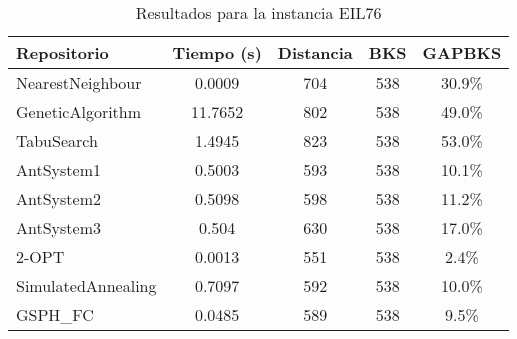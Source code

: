 \begin{table}[H]
\centering
\caption{Resultados para la instancia EIL76}
\begin{tabular}{|l|c|c|c|c|}
\hline
\textbf{Repositorio} & \textbf{Tiempo (s)} & \textbf{Distancia} & \textbf{BKS} & \textbf{GAPBKS} \\ 
\hline
NearestNeighbour & 0.0009 & 704 & 538 & 30.9\% \\ 
GeneticAlgorithm & 11.7652 & 802 & 538 & 49.0\% \\ 
TabuSearch & 1.4945 & 823 & 538 & 53.0\% \\ 
AntSystem1 & 0.5003 & 593 & 538 & 10.1\% \\ 
AntSystem2 & 0.5098 & 598 & 538 & 11.2\% \\ 
AntSystem3 & 0.504 & 630 & 538 & 17.0\% \\ 
2-OPT & 0.0013 & 551 & 538 & 2.4\% \\ 
SimulatedAnnealing & 0.7097 & 592 & 538 & 10.0\% \\ 
GSPH_FC & 0.0485 & 589 & 538 & 9.5\% \\ 
\hline
\end{tabular}
\end{table}
